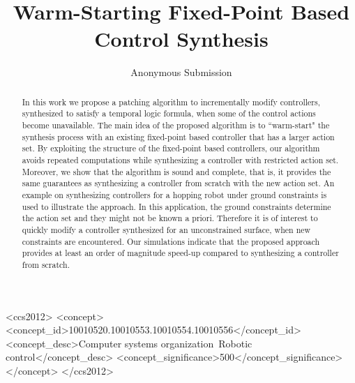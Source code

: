 \documentclass[sigconf]{acmart}
\begin{document}
\title{Warm-Starting Fixed-Point Based Control Synthesis}


\author{Anonymous Submission}

\renewcommand{\shortauthors}{Anonymous et al.}


\begin{abstract}
 In this work we propose a patching algorithm to incrementally modify controllers, synthesized to satisfy a temporal logic formula, when some of the control actions become unavailable. The main idea of the proposed algorithm is to ``warm-start" the synthesis process with an existing fixed-point based controller that has a larger action set. 
By exploiting the structure of the fixed-point based controllers, our algorithm avoids repeated computations while synthesizing a controller with restricted action set. Moreover, we show that the algorithm is sound and complete, that is, it provides the same guarantees as synthesizing a controller from scratch with the new action set.    
An example on synthesizing controllers for a hopping robot under ground constraints is used to illustrate the approach. In this application, the ground constraints determine the action set and they might not be known a priori. Therefore it is of interest to quickly modify a controller synthesized for an unconstrained surface, when new constraints are encountered. Our simulations indicate that the proposed approach provides at least an order of magnitude speed-up compared to synthesizing a controller from scratch.
\end{abstract}

%
%
\begin{CCSXML}
<ccs2012>
<concept>
<concept_id>10010520.10010553.10010554.10010556</concept_id>
<concept_desc>Computer systems organization~Robotic control</concept_desc>
<concept_significance>500</concept_significance>
</concept>
</ccs2012>
\end{CCSXML}






\maketitle







\appendix

\end{document}
